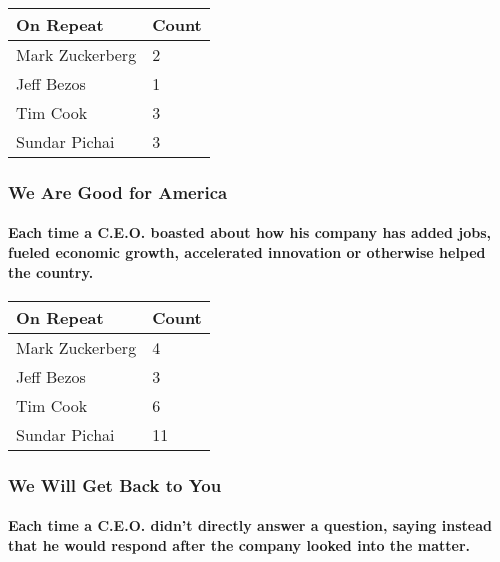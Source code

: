 \begin{longtable}[]{@{}ll@{}}
\toprule
\textbf{On Repeat} & \textbf{Count}\tabularnewline
\midrule
\endhead
Mark Zuckerberg & 2\tabularnewline
Jeff Bezos & 1\tabularnewline
Tim Cook & 3\tabularnewline
Sundar Pichai & 3\tabularnewline
\bottomrule
\end{longtable}

\hypertarget{we-are-good-for-america}{%
\subsubsection{We Are Good for America}\label{we-are-good-for-america}}

\hypertarget{each-time-a-ceo-boasted-about-how-his-company-has-added-jobs-fueled-economic-growth-accelerated-innovation-or-otherwise-helped-the-country}{%
\paragraph{Each time a C.E.O. boasted about how his company has added
jobs, fueled economic growth, accelerated innovation or otherwise helped
the
country.}\label{each-time-a-ceo-boasted-about-how-his-company-has-added-jobs-fueled-economic-growth-accelerated-innovation-or-otherwise-helped-the-country}}

\begin{longtable}[]{@{}ll@{}}
\toprule
\textbf{On Repeat} & \textbf{Count}\tabularnewline
\midrule
\endhead
Mark Zuckerberg & 4\tabularnewline
Jeff Bezos & 3\tabularnewline
Tim Cook & 6\tabularnewline
Sundar Pichai & 11\tabularnewline
\bottomrule
\end{longtable}

\hypertarget{we-will-get-back-to-you}{%
\subsubsection{We Will Get Back to You}\label{we-will-get-back-to-you}}

\hypertarget{each-time-a-ceo-didnt-directly-answer-a-question-saying-instead-that-he-would-respond-after-the-company-looked-into-the-matter}{%
\paragraph{Each time a C.E.O. didn't directly answer a question, saying
instead that he would respond after the company looked into the
matter.}\label{each-time-a-ceo-didnt-directly-answer-a-question-saying-instead-that-he-would-respond-after-the-company-looked-into-the-matter}}


